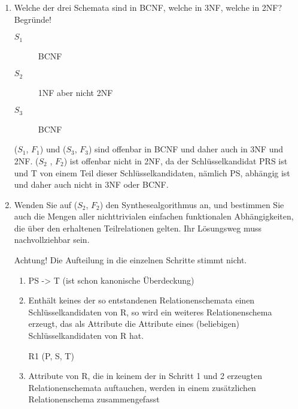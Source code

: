 \documentclass{lehramt-informatik-aufgabe}
\begin{document}
\begin{enumerate}


\item Welche der drei Schemata sind in
BCNF, welche in 3NF, welche in 2NF? Begründe!

\begin{liAntwort}
\begin{description}
\item[$S_1$] BCNF

\item[$S_2$] 1NF aber nicht 2NF

\item[$S_3$] BCNF
\end{description}

($S_1$, $F_1$) und ($S_3$, $F_3$) sind offenbar in BCNF und
daher auch in 3NF und 2NF. ($S_2$ , $F_2$) ist offenbar nicht in
2NF, da der Schlüsselkandidat PRS ist und T von einem Teil dieser
Schlüsselkandidaten, nämlich PS, abhängig ist und daher auch nicht in
3NF oder BCNF.
\end{liAntwort}


\item Wenden Sie auf ($S_2$, $F_2$) den
Synthesealgorithmus an, und bestimmen Sie
auch die Mengen aller nichttrivialen einfachen funktionalen
Abhängigkeiten, die über den erhaltenen Teilrelationen gelten. Ihr
Lösungsweg muss nachvollziehbar sein.

\begin{liAntwort}
Achtung! Die Aufteilung in die einzelnen Schritte stimmt nicht.

\begin{enumerate}
\item {}

PS -> T (ist schon kanonische Überdeckung)

\item {}

Enthält keines der so entstandenen Relationenschemata einen
Schlüsselkandidaten von R, so wird ein weiteres Relationenschema
erzeugt, das als Attribute die Attribute eines (beliebigen)
Schlüsselkandidaten von R hat.

R1 (P, S, T)

\item {}

Attribute von R, die in keinem der in Schritt 1 und 2 erzeugten
Relationenschemata auftauchen, werden in einem zusätzlichen
Relationenschema zusammengefasst


\end{enumerate}
\end{liAntwort}
\end{enumerate}
\end{document}
